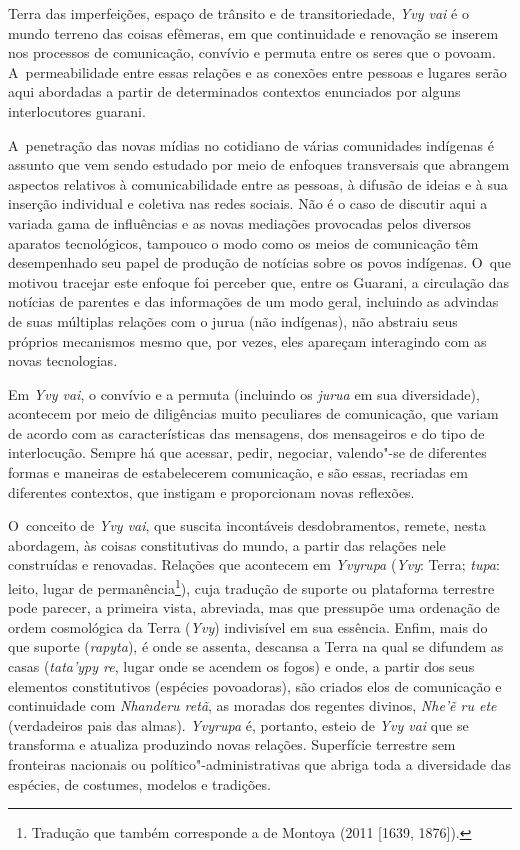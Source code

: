 Terra das imperfeições, espaço de trânsito e de transitoriedade, \emph{Yvy vai}
é o mundo terreno das coisas efêmeras, em que continuidade e renovação
se inserem nos processos de comunicação, convívio e permuta entre os
seres que o povoam. A~permeabilidade entre essas relações e as conexões
entre pessoas e lugares serão aqui abordadas a partir de determinados
contextos enunciados por alguns interlocutores guarani. 

A~penetração das novas mídias no cotidiano de várias comunidades
indígenas é assunto que vem sendo estudado por meio de enfoques
transversais que abrangem aspectos relativos à comunicabilidade entre
as pessoas, à difusão de ideias e à sua inserção individual e coletiva
nas redes sociais. Não é o caso de discutir aqui a variada gama de
influências e as novas mediações provocadas pelos diversos aparatos
tecnológicos, tampouco o modo como os meios de comunicação têm
desempenhado seu papel de produção de notícias sobre os povos
indígenas. O~que motivou tracejar este enfoque foi perceber que, entre
os Guarani, a circulação das notícias de parentes e das informações de
um modo geral, incluindo as advindas de suas múltiplas relações com o
jurua (não indígenas), não abstraiu seus próprios mecanismos mesmo que,
por vezes, eles apareçam interagindo com as novas tecnologias.

Em \emph{Yvy vai}, o convívio e a permuta (incluindo os \emph{jurua} em sua
diversidade), acontecem por meio de diligências muito peculiares de
comunicação, que variam de acordo com as características das mensagens,
dos mensageiros e do tipo de interlocução. Sempre há que acessar,
pedir, negociar, valendo"-se de diferentes formas e maneiras de
estabelecerem comunicação, e são essas, recriadas em diferentes
contextos, que instigam e proporcionam novas reflexões. 

O~conceito de \emph{Yvy vai}, que suscita incontáveis desdobramentos, remete,
nesta abordagem, às coisas constitutivas do mundo, a partir das
relações nele construídas e renovadas. Relações que acontecem em
\emph{Yvyrupa} (\emph{Yvy}: Terra; \emph{tupa}: leito, lugar de
permanência\footnote{Tradução que também corresponde a de Montoya (2011
[1639, 1876]). }), cuja tradução de suporte ou plataforma terrestre
pode parecer, a primeira vista, abreviada, mas que pressupõe uma
ordenação de ordem cosmológica da Terra (\emph{Yvy}) indivisível em sua
essência. Enfim, mais do que suporte (\emph{rapyta}), é onde se assenta,
descansa a Terra na qual se difundem as casas (\emph{tata’ypy re}, lugar onde
se acendem os fogos) e onde, a partir dos seus elementos constitutivos
(espécies povoadoras), são criados elos de comunicação e continuidade
com \emph{Nhanderu retã}, as moradas dos regentes divinos, \emph{Nhe’ẽ ru ete}
(verdadeiros pais das almas). \emph{Yvyrupa} é, portanto, esteio de \emph{Yvy vai}
que se transforma e atualiza produzindo novas relações. Superfície
terrestre sem fronteiras nacionais ou político"-administrativas que
abriga toda a diversidade das espécies, de costumes, modelos e
tradições. 


